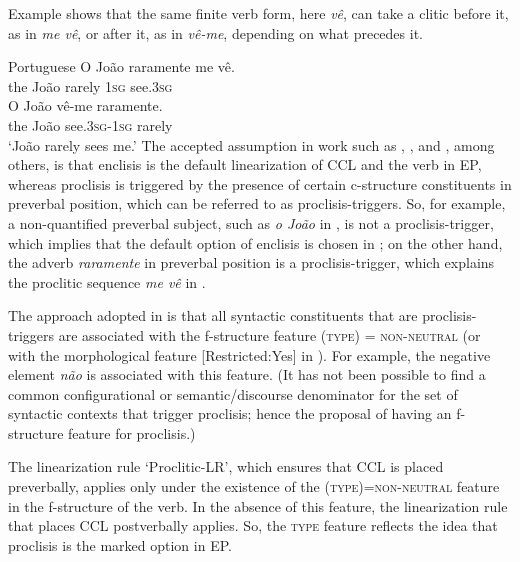 \documentclass[output=paper,hidelinks]{langscibook}
\begin{document}
Example  shows that the same finite verb form, here \textit{vê}, can take a clitic before it, as in \textit{me vê}, or after it, as in \textit{vê-me}, depending on what precedes it. 

\ea\label{ex:Romance:8} Portuguese \citep{LuisOtoguro2004}
\ea\label{ex:Romance:8a}
\gll
O João raramente me vê.\\
the João rarely 1\textsc{sg} see.3\textsc{sg}\\
\ex\label{ex:Romance:8b}
\gll
O João vê-me raramente.\\
the João see.3\textsc{sg}{}-1\textsc{sg} rarely\\
\glt   `João rarely sees me.'
\z\z
The accepted assumption in work such as \citet{LuisSadler2003}, \citet{LuisOtoguro2004,LuisOtoguro2005}, and \citet{LuisSpencer2005}, among others, is that enclisis is the default linearization of CCL and the verb in EP, whereas proclisis is triggered by the presence of certain c-structure constituents in preverbal position, which can be referred to as proclisis-triggers. So, for example, a non-quantified preverbal subject, such as \textit{o João} in , is not a proclisis-trigger, which implies that the default option of enclisis is chosen in ; on the other hand, the adverb \textit{raramente} in preverbal position is a proclisis-trigger, which explains the proclitic sequence \textit{me vê} in .

\begin{sloppypar}
The approach adopted in \citet{LuisSadler2003} is that all syntactic constituents that are proclisis-triggers are associated with the f-structure feature \mbox{(\UP\textsc{type})} = \textsc{non-neu\-tral} (or with the morphological feature [Restricted:Yes] in \citealt{LuisOtoguro2004}). For example, the negative element \textit{não} is associated with this feature. (It has not been possible to find a common configurational or semantic/discourse denominator for the set of syntactic contexts that trigger proclisis; hence the proposal of having an f-structure feature for proclisis.) 
\end{sloppypar}

The linearization rule `Proclitic-LR', which ensures that CCL is placed preverbally, applies only under the existence of the (\UP\textsc{type})=\textsc{non-neutral} feature in the f-structure of the verb. In the absence of this feature, the linearization rule that places CCL postverbally applies. So, the \textsc{type} feature reflects the idea that proclisis is the marked option in EP.
\end{document}
